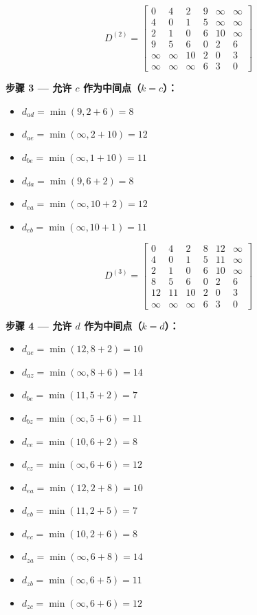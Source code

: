 \documentclass[11pt,UTF8]{article}
\begin{document}
\[
D^{(2)} = \begin{bmatrix}
0 & 4 & 2 & 9 & \infty & \infty \\
4 & 0 & 1 & 5 & \infty & \infty \\
2 & 1 & 0 & 6 & 10 & \infty \\
9 & 5 & 6 & 0 & 2 & 6 \\
\infty & \infty & 10 & 2 & 0 & 3 \\
\infty & \infty & \infty & 6 & 3 & 0
\end{bmatrix}
\]

\textbf{步骤 3 — 允许 $c$ 作为中间点（$k=c$）：}
\begin{itemize}
    \item $d_{ad} = \min(9, 2+6) = 8$
    \item $d_{ae} = \min(\infty, 2+10) = 12$
    \item $d_{be} = \min(\infty, 1+10) = 11$
    \item $d_{da} = \min(9, 6+2) = 8$
    \item $d_{ea} = \min(\infty, 10+2) = 12$
    \item $d_{eb} = \min(\infty, 10+1) = 11$
\end{itemize}

\[
D^{(3)} = \begin{bmatrix}
0 & 4 & 2 & 8 & 12 & \infty \\
4 & 0 & 1 & 5 & 11 & \infty \\
2 & 1 & 0 & 6 & 10 & \infty \\
8 & 5 & 6 & 0 & 2 & 6 \\
12 & 11 & 10 & 2 & 0 & 3 \\
\infty & \infty & \infty & 6 & 3 & 0
\end{bmatrix}
\]

\textbf{步骤 4 — 允许 $d$ 作为中间点（$k=d$）：}
\begin{itemize}
    \item $d_{ae} = \min(12, 8+2) = 10$
    \item $d_{az} = \min(\infty, 8+6) = 14$
    \item $d_{be} = \min(11, 5+2) = 7$
    \item $d_{bz} = \min(\infty, 5+6) = 11$
    \item $d_{ce} = \min(10, 6+2) = 8$
    \item $d_{cz} = \min(\infty, 6+6) = 12$
    \item $d_{ea} = \min(12, 2+8) = 10$
    \item $d_{eb} = \min(11, 2+5) = 7$
    \item $d_{ec} = \min(10, 2+6) = 8$
    \item $d_{za} = \min(\infty, 6+8) = 14$
    \item $d_{zb} = \min(\infty, 6+5) = 11$
    \item $d_{zc} = \min(\infty, 6+6) = 12$
\end{itemize}
\end{document}
